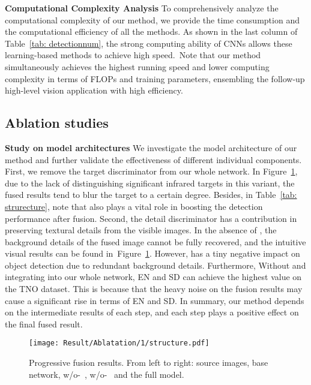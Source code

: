 \documentclass[10pt,twocolumn,letterpaper]{article}
\begin{document}
\noindent\textbf{Computational Complexity Analysis} 
To comprehensively analyze the computational complexity of our method, we provide the time consumption and the computational efficiency of all the methods. As shown in the last column of Table~\ref{tab: detectionnum}, the strong computing ability of CNNs allows these learning-based methods to achieve high speed.~Note that our method simultaneously achieves the highest running speed and lower computing complexity in terms of FLOPs and training parameters, ensembling the follow-up high-level vision application with high efficiency.

\subsection{Ablation studies}
\noindent\textbf{Study on model architectures}
We investigate the model architecture of our method and further validate the effectiveness of different individual components. First, we remove the target discriminator  from our whole network. In Figure~\ref{fig:abstructure}, due to the lack of distinguishing significant infrared targets in this variant, the fused results tend to blur the target to a certain degree. Besides, in Table~\ref{tab: strurecture}, note that  also plays a vital role in boosting the detection performance after fusion.  Second, the detail discriminator  has a contribution in preserving textural details from the visible images. In the absence of , the background details of the fused image cannot be fully recovered, and the intuitive visual results can be found in~Figure~\ref{fig:abstructure}.  However,  has a tiny negative impact on object detection due to redundant background details.  Furthermore, Without  and  integrating into our whole network, EN and SD can achieve the highest value on the TNO dataset. This is because that the heavy noise on the fusion results may cause a significant rise in terms of EN and SD. In summary, our method depends on the intermediate results of each step, and each step plays a positive effect on the final fused result. 
\begin{figure}[!htb]
	\centering
	\setlength{\tabcolsep}{1pt} 
	
	\texttt{[image: Result/Ablatation/1/structure.pdf]}
	
	\caption{Progressive fusion results. From left to right: source images, base network, w/o-~, w/o-~ and the full model.}
	\label{fig:abstructure}
	\vspace{-0.5cm}  
\end{figure}
\end{document}
